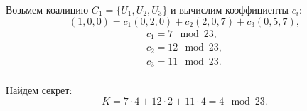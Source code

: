 Возьмем коалицию $C_1 = \{ U_1, U_2, U_3 \}$ и вычислим коэффициенты $c_i$:
    \[ (1,0,0) = c_1 (0,2,0) + c_2 (2,0,7) + c_3 (0,5,7), \]
\[ \begin{array}{l}
    c_1 = 7 \mod 23, \\
    c_2 = 12 \mod 23, \\
    c_3 = 11 \mod 23. \\
\end{array} \]

Найдем секрет:
    \[ K = 7 \cdot 4 + 12 \cdot 2 + 11 \cdot 4 = 4 \mod 23.\]
\exampleend
